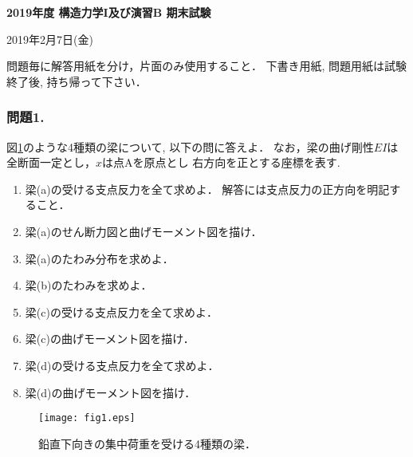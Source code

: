 \documentclass[10pt,a4j]{jarticle}
\newlength{\minitwocolumn}
\begin{document}
\newcommand{\fat}[1]{\mbox{\boldmath $#1$}}
\newcommand{\D}{\partial}
\newcommand{\w}{\omega}
\newcommand{\ga}{\alpha}
\newcommand{\gb}{\beta}
\newcommand{\gx}{\xi}
\newcommand{\gz}{\zeta}
\newcommand{\vhat}[1]{\hat{\fat{#1}}}
\newcommand{\spc}{\vspace{0.7\baselineskip}}
\newcommand{\halfspc}{\vspace{0.3\baselineskip}}

\newcommand{\twofig}[2]
 {
   \begin{figure}[h]
     \begin{minipage}[t]{\minitwocolumn}
         \begin{center}   #1
         \end{center}
     \end{minipage}
         \hspace{\columnsep}
     \begin{minipage}[t]{\minitwocolumn}
         \begin{center} #2
         \end{center}
     \end{minipage}
   \end{figure}
 }
\begin{center}
{\Large \bf 2019年度 構造力学I及び演習B 期末試験} \\
\end{center}
\begin{flushright}
	2019年2月7日(金)
\end{flushright}
問題毎に解答用紙を分け，片面のみ使用すること．
下書き用紙, 問題用紙は試験終了後, 持ち帰って下さい．
%
%
%
\subsubsection*{問題1.}
図\ref{fig:fig1}のような4種類の梁について, 以下の問に答えよ．
なお，梁の曲げ剛性$EI$は全断面一定とし，$x$は点Aを原点とし
右方向を正とする座標を表す. 
\begin{enumerate}
\item
	梁(a)の受ける支点反力を全て求めよ．
	解答には支点反力の正方向を明記すること．
\item
	梁(a)のせん断力図と曲げモーメント図を描け．
\item
	梁(a)のたわみ分布を求めよ．
\item
	梁(b)のたわみを求めよ．
\item
	梁(c)の受ける支点反力を全て求めよ．
\item
	梁(c)の曲げモーメント図を描け．
\item
	梁(d)の受ける支点反力を全て求めよ．
\item
	梁(d)の曲げモーメント図を描け．
\end{enumerate}
\begin{figure}[h]
	\begin{center}
	\texttt{[image: fig1.eps]} 
	\end{center}
	\caption{鉛直下向きの集中荷重を受ける4種類の梁．} 
	\label{fig:fig1}
\end{figure}
\newpage
\end{document}
